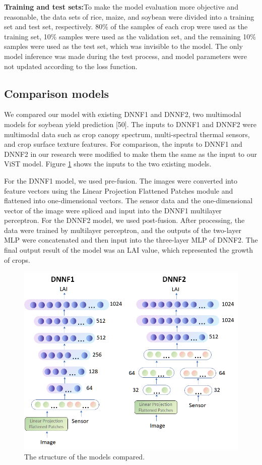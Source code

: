 \documentclass[acmsmall,manuscript, screen, review]{acmart}
\begin{document}
\textbf{Training and test sets:}To make the model evaluation more objective and reasonable, the data sets of rice, maize, and soybean were divided into a training set and test set, respectively. 80\% of the samples of each crop were used as the training set, 10\% samples were used as the validation set, and the remaining 10\% samples were used as the test set, which was invisible to the model. The only model inference was made during the test process, and model parameters were not updated according to the loss function.

\subsection{Comparison models}
We compared our model with existing DNNF1 and DNNF2, two multimodal models for soybean yield prediction [50]. The inputs to DNNF1 and DNNF2 were multimodal data such as crop canopy spectrum, multi-spectral thermal sensors, and crop surface texture features. For comparison, the inputs to DNNF1 and DNNF2 in our research were modified to make them the same as the input to our ViST model. Figure \ref{dnnf1_and_dnnf2_model} shows the inputs to the two existing models.

For the DNNF1 model, we used pre-fusion. The images were converted into feature vectors using the Linear Projection Flattened Patches module and flattened into one-dimensional vectors. The sensor data and the one-dimensional vector of the image were spliced and input into the DNNF1 multilayer perceptron. For the DNNF2 model, we used post-fusion. After processing, the data were trained by multilayer perceptron, and the outputs of the two-layer MLP were concatenated and then input into the three-layer MLP of DNNF2. The final output result of the model was an LAI value, which represented the growth of crops.



\begin{figure}[htbp]
  \centering
  \includegraphics[width=0.8\linewidth]{pic/dnnf1_and_dnnf2_model.png}
  \caption{The structure of the models compared.}
  \label{dnnf1_and_dnnf2_model}
\end{figure}
\end{document}

